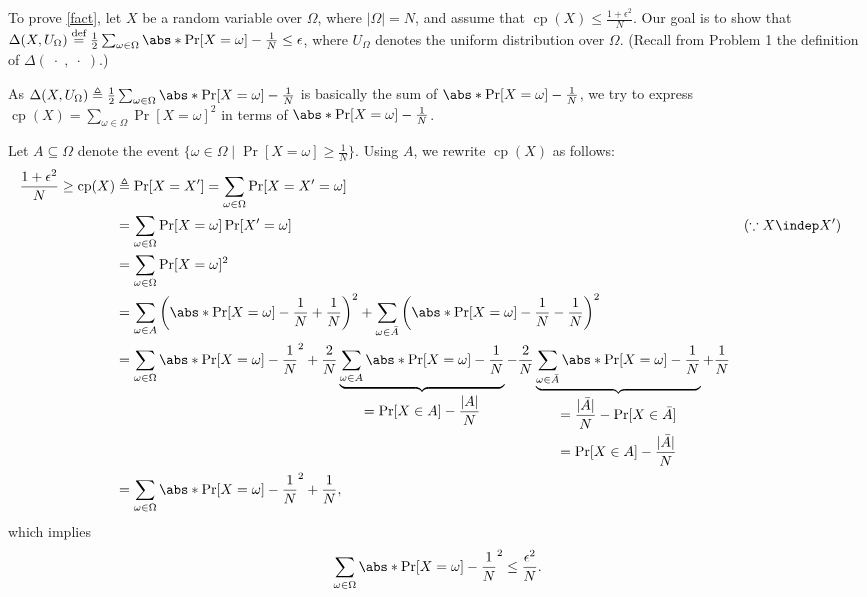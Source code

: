 \begin{answer}[iv]
    To prove \autoref{fact}, let $X$ be a random variable over $\Omega$, where $|\Omega|=N$, and assume that $\mathop{\textrm{cp}}(X)\le  \frac{1+\epsilon^2}{N}$. Our goal is to show that $\Delta(X, U_\Omega)\stackrel{\textrm{def}}= \frac{1}{2} \sum_{\omega\in\Omega}\abs*{\Pr[X=\omega]-\frac{1}{N}}\le  \epsilon$, where $U_\Omega$ denotes the uniform distribution over $\Omega$. (Recall from Problem 1 the definition of $\Delta(\;\cdot\;, \;\cdot\;)$.)

    \begin{idea}
        As $\Delta(X, U_\Omega)\triangleq \frac{1}{2} \sum_{\omega\in\Omega}\abs*{\Pr[X=\omega]-\frac{1}{N}}$ is basically the sum of $\abs*{\Pr[X=\omega]-\frac{1}{N}}$, we try to express $\mathop{\textrm{cp}}(X)=\sum_{\omega\in\Omega}\Pr[X=\omega]^2$ in terms of $\abs*{\Pr[X=\omega]-\frac{1}{N}}$.
    \end{idea}

    Let $A\subseteq \Omega$ denote the event $\{\omega\in\Omega\mid \Pr[X=\omega]\ge \frac{1}{N}\}$. Using $A$, we rewrite $\mathop{\textrm{cp}}(X)$ as follows:
    \begin{align*}
         \frac{1+\epsilon^2}{N} \ge \mathop{\textrm{cp}}(X)
         &\triangleq \Pr[X=X'] = \sum_{\omega\in\Omega} \Pr[X=X'=\omega]\\
         &= \sum_{\omega\in\Omega} \Pr[X=\omega]\Pr[X'=\omega] && (\because X\indep X')\\
         &= \sum_{\omega\in\Omega} \Pr[X=\omega]^2\\
         &= \sum_{\omega\in A} \left(\abs*{\Pr[X=\omega]-\frac{1}{N}}+\frac{1}{N} \right)^2 +\sum_{\omega\in \bar{A}} \left(\abs*{\Pr[X=\omega]-\frac{1}{N}}-\frac{1}{N} \right)^2\\
         &= \sum_{\omega\in \Omega} \abs*{\Pr[X=\omega]-\frac{1}{N}}^2 
         + \frac{2}{N} \underbrace{\sum_{\omega\in A}\abs*{\Pr[X=\omega]-\frac{1}{N}}}_{
         \begin{gathered}
            =\Pr[X\in A] - \frac{|A|}{N}
         \end{gathered}
         } - \frac{2}{N}\underbrace{\sum_{\omega\in \bar{A}}\abs*{\Pr[X=\omega]-\frac{1}{N}}}_{
        \begin{gathered}
            = \frac{|\bar{A}|}{N} -\Pr[X\in \bar{A}]\\
            = \Pr[X\in A]-\frac{|\bar{A}|}{N}
        \end{gathered}
        }+\frac{1}{N}\\
        &= \sum_{\omega\in \Omega} \abs*{\Pr[X=\omega]-\frac{1}{N}}^2 + \frac{1}{N},
    \end{align*}
    which implies 
    \begin{equation}\label{eq:p2-4-1}
        \sum_{\omega\in \Omega} \abs*{\Pr[X=\omega]-\frac{1}{N}}^2 \le \frac{\epsilon^2}{N}.
    \end{equation}


\end{answer}
